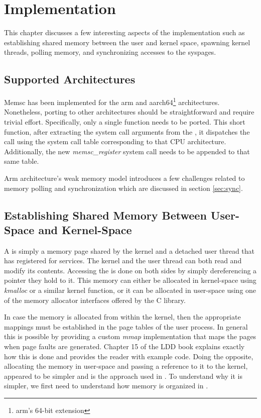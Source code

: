 \chapter{Implementation}
\label{chap:implementation}

This chapter discusses a few interesting aspects of the \memsc implementation
such as establishing shared memory between the user and kernel space, spawning
kernel threads, polling memory, and synchronizing accesses to the syspages.

\section{Supported Architectures}

Memsc has been implemented for the arm and aarch64\footnote{arm's 64-bit
extension} architectures. Nonetheless, porting \memsc to other architectures
should be straightforward and require trivial effort. Specifically, only a
single function needs to be ported. This short function, after extracting the
system call arguments from the \sysp, it dispatches the call using the system
call table corresponding to that CPU architecture. Additionally, the new
\emph{memsc\_register} system call needs to be appended to that same table.

Arm architecture's weak memory model introduces a few challenges related to
memory polling and synchronization which are discussed in section
\ref{sec:sync}.

\section{Establishing Shared Memory Between User-Space and Kernel-Space}

A \sysp is simply a memory page shared by the kernel and a detached user thread
that has registered for \memsc services. The kernel and the user thread can
both read and modify its contents. Accessing the \sysp is done on both sides by
simply dereferencing a pointer they hold to it. This memory can either be
allocated in kernel-space using \emph{kmalloc} or a similar kernel function, or
it can be allocated in user-space using one of the memory allocator interfaces
offered by the C library.

In case the memory is allocated from within the kernel, then the appropriate
mappings must be established in the page tables of the user process. In general
this is possible by providing a custom \emph{mmap} implementation that maps the
pages when page faults are generated. Chapter 15 of the LDD book \cite{ldd}
explains exactly how this is done and provides the reader with example code.
Doing the opposite, allocating the memory in user-space and passing a reference
to it to the kernel, appeared to be simpler and is the approach used in \memsc.
To understand why it is simpler, we first need to understand how memory is
organized in \llinux.

